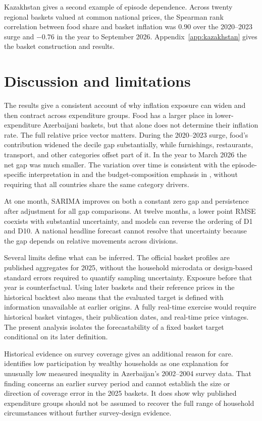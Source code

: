\documentclass[11pt,a4paper]{article}
\begin{document}
Kazakhstan gives a second example of episode dependence. Across twenty regional baskets valued at common national prices, the Spearman rank correlation between food share and basket inflation was $0.90$ over the 2020--2023 surge and $-0.76$ in the year to September 2026. Appendix~\ref{app:kazakhstan} gives the basket construction and results.

\section{Discussion and limitations}

The results give a consistent account of why inflation exposure can widen and then contract across expenditure groups. Food has a larger place in lower-expenditure Azerbaijani baskets, but that alone does not determine their inflation rate. The full relative price vector matters. During the 2020--2023 surge, food's contribution widened the decile gap substantially, while furnishings, restaurants, transport, and other categories offset part of it. In the year to March 2026 the net gap was much smaller. The variation over time is consistent with the episode-specific interpretation in \citet{lydon2022} and the budget-composition emphasis in \citet{can2025}, without requiring that all countries share the same category drivers.

At one month, SARIMA improves on both a constant zero gap and persistence after adjustment for all gap comparisons. At twelve months, a lower point RMSE coexists with substantial uncertainty, and models can reverse the ordering of D1 and D10. A national headline forecast cannot resolve that uncertainty because the gap depends on relative movements across divisions.

Several limits define what can be inferred. The official basket profiles are published aggregates for 2025, without the household microdata or design-based standard errors required to quantify sampling uncertainty. Exposure before that year is counterfactual. Using later baskets and their reference prices in the historical backtest also means that the evaluated target is defined with information unavailable at earlier origins. A fully real-time exercise would require historical basket vintages, their publication dates, and real-time price vintages. The present analysis isolates the forecastability of a fixed basket target conditional on its later definition.

Historical evidence on survey coverage gives an additional reason for care. \citet{ersado2006} identifies low participation by wealthy households as one explanation for unusually low measured inequality in Azerbaijan's 2002--2004 survey data. That finding concerns an earlier survey period and cannot establish the size or direction of coverage error in the 2025 baskets. It does show why published expenditure groups should not be assumed to recover the full range of household circumstances without further survey-design evidence.
\end{document}
